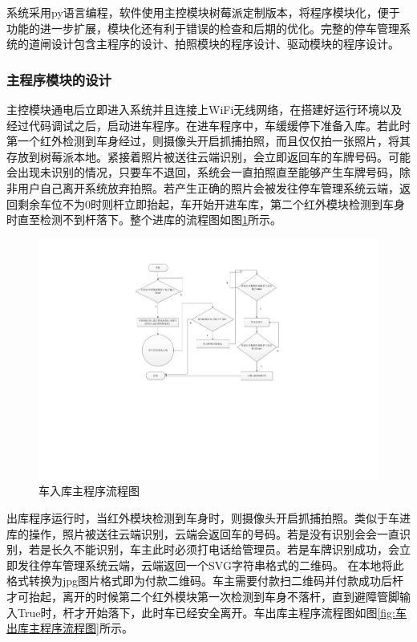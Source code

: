 系统采用py语言编程，软件使用主控模块树莓派定制版本，将程序模块化，便于功能的进一步扩展，模块化还有利于错误的检查和后期的优化。完整的停车管理系统的道闸设计包含主程序的设计、拍照模块的程序设计、驱动模块的程序设计。

\subsubsection{主程序模块的设计}

主控模块通电后立即进入系统并且连接上WiFi无线网络，在搭建好运行环境以及经过代码调试之后，启动进车程序。在进车程序中，车缓缓停下准备入库。若此时第一个红外检测到车身经过，则摄像头开启抓捕拍照，而且仅仅拍一张照片，将其存放到树莓派本地。紧接着照片被送往云端识别，会立即返回车的车牌号码。可能会出现未识别的情况，只要车不退回，系统会一直拍照直至能够产生车牌号码，除非用户自己离开系统放弃拍照。若产生正确的照片会被发往停车管理系统云端，返回剩余车位不为0时则杆立即抬起，车开始开进车库，第二个红外模块检测到车身时直至检测不到杆落下。整个进库的流程图如图\ref{fig:车入库主程序流程图}所示。

\begin{figure}[htbp]
	\centering
	\includegraphics[width=\textwidth]{figure/software-1.pdf}
	\caption{车入库主程序流程图}\label{fig:车入库主程序流程图}
\end{figure}

出库程序运行时，当红外模块检测到车身时，则摄像头开启抓捕拍照。类似于车进库的操作，照片被送往云端识别，云端会返回车的号码。若是没有识别会会一直识别，若是长久不能识别，车主此时必须打电话给管理员。若是车牌识别成功，会立即发往停车管理系统云端，云端返回一个SVG字符串格式的二维码。
在本地将此格式转换为jpg图片格式即为付款二维码。车主需要付款扫二维码并付款成功后杆才可抬起，离开的时候第二个红外模块第一次检测到车身不落杆，直到避障管脚输入True时，杆才开始落下，此时车已经安全离开。车出库主程序流程图如图\ref{fig:车出库主程序流程图}所示。
 
